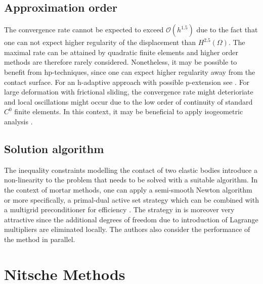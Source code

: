 \documentclass[12pt]{article}
\begin{document}
\subsection{Approximation order}
The convergence rate cannot be expected to exceed $\mathcal{O}(h^{1.5})$ due to the fact that one can not expect higher regularity of the displacement than $H^{2.5}(\Omega)$. The maximal rate can be attained by quadratic finite elements and higher order methods are therefore rarely considered. Nonetheless, it may be possible to benefit from hp-techniques, since one can expect higher regularity away from the contact surface. For an h-adaptive approach with possible p-extension see \cite{rachowicz2017h}. For large deformation with frictional sliding, the convergence rate might deterioriate and local oscillations might occur due to the low order of continuity of standard $C^0$ finite elements. In this context, it may be beneficial to apply isogeometric analysis \cite{de2011large,brivadis2015isogeometric}.

\subsection{Solution algorithm}
The inequality constraints modelling the contact of two elastic bodies introduce a non-linearity to the problem that needs to be solved with a suitable algorithm. In the context of mortar methods, one can apply a semi-smooth Newton algorithm or more specifically, a primal-dual active set strategy \cite{hintermuller2002primal} which can be combined with a multigrid preconditioner for efficiency \cite{hueber2005primal,wiesner2018algebraic}. The strategy in \cite{wiesner2018algebraic} is moreover very attractive since the additional degrees of freedom due to introduction of Lagrange multipliers are eliminated locally. The authors also consider the performance of the method in parallel.

\section{Nitsche Methods}


\end{document}
